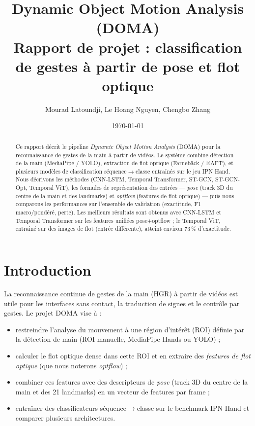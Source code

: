 \documentclass[11pt,a4paper]{article}
\title{Dynamic Object Motion Analysis (DOMA)\\Rapport de projet : classification de gestes à partir de pose et flot optique}
\author{Mourad Latoundji, Le Hoang Nguyen, Chengbo Zhang}
\date{\today}
\begin{document}
\maketitle

\begin{abstract}
Ce rapport décrit le pipeline \emph{Dynamic Object Motion Analysis} (DOMA) pour la reconnaissance de gestes de la main à partir de vidéos. Le système combine détection de la main (MediaPipe / YOLO), extraction de flot optique (Farnebäck / RAFT), et plusieurs modèles de classification séquence$\to$classe entraînés sur le jeu IPN Hand. Nous décrivons les méthodes (CNN-LSTM, Temporal Transformer, ST-GCN, ST-GCN-Opt, Temporal ViT), les formules de représentation des entrées — \emph{pose} (track 3D du centre de la main et des landmarks) et \emph{optflow} (features de flot optique) — puis nous comparons les performances sur l’ensemble de validation (exactitude, F1 macro/pondéré, perte). Les meilleurs résultats sont obtenus avec CNN-LSTM et Temporal Transformer sur les features unifiées pose+optflow ; le Temporal ViT, entraîné sur des images de flot (entrée différente), atteint environ 73\,\% d'exactitude.
\end{abstract}

\tableofcontents
\newpage

\section{Introduction}

La reconnaissance continue de gestes de la main (HGR) à partir de vidéos est utile pour les interfaces sans contact, la traduction de signes et le contrôle par gestes. Le projet DOMA vise à :

\begin{itemize}
  \item restreindre l’analyse du mouvement à une région d’intérêt (ROI) définie par la détection de main (ROI manuelle, MediaPipe Hands ou YOLO) ;
  \item calculer le flot optique dense dans cette ROI et en extraire des \emph{features de flot optique} (que nous noterons \emph{optflow}) ;
  \item combiner ces features avec des descripteurs de \emph{pose} (track 3D du centre de la main et des 21 landmarks) en un vecteur de features par frame ;
  \item entraîner des classificateurs séquence$\to$classe sur le benchmark IPN Hand et comparer plusieurs architectures.
\end{itemize}
\end{document}
